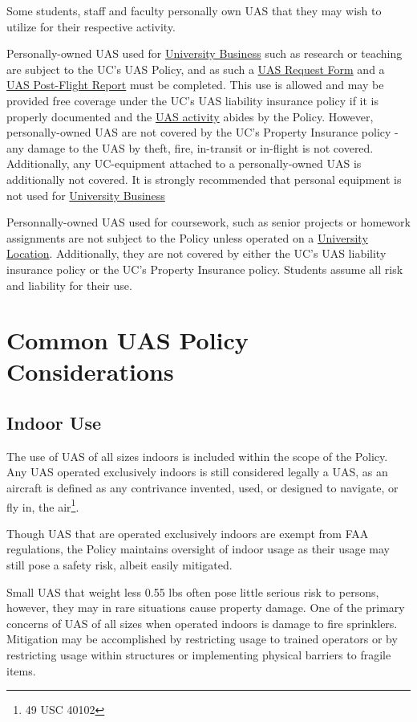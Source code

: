 \documentclass[
]{book}
\begin{document}
Some students, staff and faculty personally own UAS that they may wish to utilize for their respective activity.

Personally-owned UAS used for \protect\hyperlink{UB}{University Business} such as research or teaching are subject to the UC's UAS Policy, and as such a \protect\hyperlink{FR}{UAS Request Form} and a \protect\hyperlink{postflight}{UAS Post-Flight Report} must be completed. This use is allowed and may be provided free coverage under the UC's UAS liability insurance policy if it is properly documented and the \protect\hyperlink{UASactivity}{UAS activity} abides by the Policy. However, personally-owned UAS are not covered by the UC's Property Insurance policy - any damage to the UAS by theft, fire, in-transit or in-flight is not covered. Additionally, any UC-equipment attached to a personally-owned UAS is additionally not covered. It is strongly recommended that personal equipment is not used for \protect\hyperlink{UB}{University Business}

Personnally-owned UAS used for coursework, such as senior projects or homework assignments are not subject to the Policy unless operated on a \protect\hyperlink{UL}{University Location}. Additionally, they are not covered by either the UC's UAS liability insurance policy or the UC's Property Insurance policy. Students assume all risk and liability for their use.

\hypertarget{ch-common-considerations}{%
\chapter{Common UAS Policy Considerations}\label{ch-common-considerations}}

\hypertarget{indoor-use}{%
\section{Indoor Use}\label{indoor-use}}

The use of UAS of all sizes indoors is included within the scope of the Policy. Any UAS operated exclusively indoors is still considered legally a UAS, as an aircraft is defined as any contrivance invented, used, or designed to navigate, or fly in, the air\footnote{49 USC 40102}.

Though UAS that are operated exclusively indoors are exempt from FAA regulations, the Policy maintains oversight of indoor usage as their usage may still pose a safety risk, albeit easily mitigated.

Small UAS that weight less 0.55 lbs often pose little serious risk to persons, however, they may in rare situations cause property damage. One of the primary concerns of UAS of all sizes when operated indoors is damage to fire sprinklers. Mitigation may be accomplished by restricting usage to trained operators or by restricting usage within structures or implementing physical barriers to fragile items.
\end{document}
